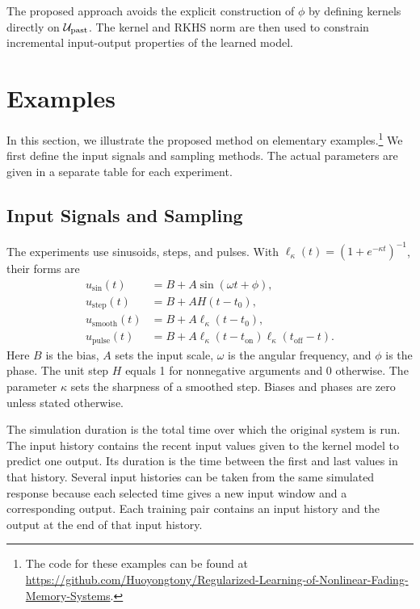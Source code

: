 The proposed approach avoids the explicit construction of $\phi$ by defining kernels directly on ${\cal U}_\text{past}$. The kernel and RKHS norm are then used to constrain incremental input-output properties of the learned model.


\section{Examples}\label{sec:Kernel_example}
In this section, we illustrate the proposed method on elementary examples.\footnote{The code for these examples can be found at \url{https://github.com/Huoyongtony/Regularized-Learning-of-Nonlinear-Fading-Memory-Systems}.}
\textcolor{examineredit}{We first define the input signals and sampling methods. The actual parameters are given in a separate table for each experiment.}
\subsection[Input Signals and Sampling]{\textcolor{examineredit}{Input Signals and Sampling}}\label{sec:kernel-simulation-details}
\begingroup
\color{examineredit}
The experiments use sinusoids, steps, and pulses. With \(\ell_\kappa(t)=(1+e^{-\kappa t})^{-1}\), their forms are
\[
\begin{aligned}
 u_{\mathrm{sin}}(t)&=B+A\sin(\omega t+\phi),\\
 u_{\mathrm{step}}(t)&=B+AH(t-t_0),\\
 u_{\mathrm{smooth}}(t)&=B+A\ell_\kappa(t-t_0),\\
 u_{\mathrm{pulse}}(t)&=B+A\ell_\kappa(t-t_{\mathrm{on}})\ell_\kappa(t_{\mathrm{off}}-t).
\end{aligned}
\]
Here \(B\) is the bias, \(A\) sets the input scale, \(\omega\) is the angular frequency, and \(\phi\) is the phase. The unit step \(H\) equals 1 for nonnegative arguments and 0 otherwise. The parameter \(\kappa\) sets the sharpness of a smoothed step. Biases and phases are zero unless stated otherwise.

The simulation duration is the total time over which the original system is run. The input history contains the recent input values given to the kernel model to predict one output. Its duration is the time between the first and last values in that history. Several input histories can be taken from the same simulated response because each selected time gives a new input window and a corresponding output. Each training pair contains an input history and the output at the end of that input history.

